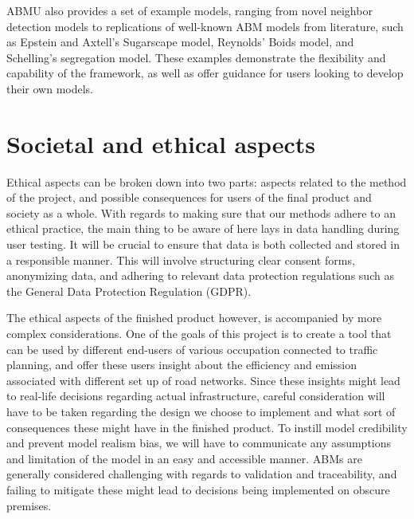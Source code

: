         ABMU also provides a set of example models, ranging from novel neighbor detection models to replications of well-known ABM models from literature, such as Epstein and Axtell's Sugarscape model, Reynolds' Boids model, and Schelling's segregation model. These examples demonstrate the flexibility and capability of the framework, as well as offer guidance for users looking to develop their own models.

\section{Societal and ethical aspects}
    Ethical aspects can be broken down into two parts: aspects related to the method of the project, and possible consequences for users of the final product and society as a whole.  With regards to making sure that our methods adhere to an ethical practice, the main thing to be aware of here lays in data handling during user testing. It will be crucial to ensure that data is both collected and stored in a responsible manner. This will involve structuring clear consent forms, anonymizing data, and adhering to relevant data protection regulations such as the General Data Protection Regulation (GDPR).

    The ethical aspects of the finished product however, is accompanied by more complex considerations. One of the goals of this project is to create a tool that can be used by different end-users of various occupation connected to traffic planning, and offer these users insight about the efficiency and emission associated with different set up of road networks. Since these insights might lead to real-life decisions regarding actual infrastructure, careful consideration will have to be taken regarding the design we choose to implement and what sort of consequences these might have in the finished product. To instill model credibility and prevent model realism bias, we will have to communicate any assumptions and limitation of the model in an easy and accessible manner. ABMs are generally considered challenging with regards to validation and traceability\cite{abm-validation-issues}, and failing to mitigate these might lead to decisions being implemented on obscure premises. 

